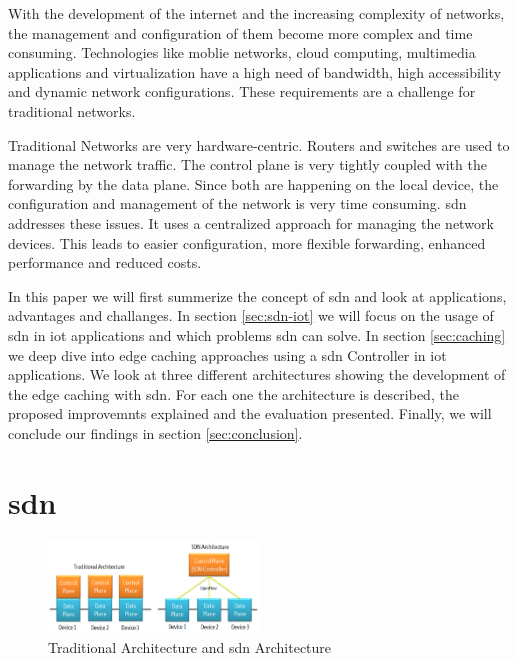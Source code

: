 \documentclass[conference]{IEEEtran}
\begin{document}
	With the development of the internet and the increasing complexity of networks, the management and configuration of them become more complex and time consuming. Technologies like moblie networks, cloud computing, multimedia applications and virtualization have a high need of bandwidth, high accessibility and dynamic network configurations. These requirements are a challenge for traditional networks. 

	Traditional Networks are very hardware-centric. Routers and switches are used to manage the network traffic. The control plane is very tightly coupled with the forwarding by the data plane. Since both are happening on the local device, the configuration and management of the network is very time consuming. \acf{sdn} addresses these issues. It uses a centralized approach for managing the network devices. This leads to easier configuration, more flexible forwarding, enhanced performance and reduced costs. \cite{Jefia2018-pj} \cite{MASOUDI20161}


	In this paper we will first summerize the concept of \ac{sdn} and look at applications, advantages and challanges. In section \ref{sec:sdn-iot} we will focus on the usage of \ac{sdn} in \ac{iot} applications and which problems \ac{sdn} can solve. In section \ref{sec:caching} we deep dive  into edge caching approaches using a \ac{sdn} Controller in \ac{iot} applications. We look at three different architectures showing the development of the edge caching with \ac{sdn}. For each one the architecture is described, the proposed improvemnts explained and the evaluation presented. Finally, we will conclude our findings in section \ref{sec:conclusion}. 

	\section{\ac{sdn}}
	\label{sec:sdn}

	\begin{figure}
		\centering
		\includegraphics[width=0.5\textwidth]{figures/architecture-compare.png}
		\caption{Traditional Architecture and \ac{sdn} Architecture \cite{Jefia2018-pj}}
		\label{fig:architecture-compare}
	\end{figure}
\end{document}
